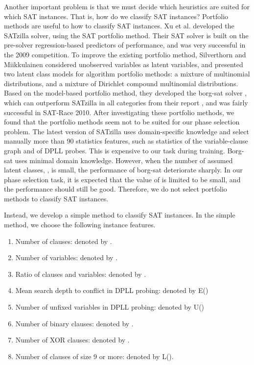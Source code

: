\documentclass{llncs}
\begin{document}
Another important problem is that we must decide which heuristics
are suited for which SAT instances. That is, how do we classify SAT
instances? Portfolio methods are useful to how to classify SAT
instances. Xu et al. \cite {XuA:9,XuB:10} developed the SATzilla
solver, using the SAT portfolio method. Their SAT solver is built on
the pre-solver regression-based predictors of performance, and was
very successful in the 2009 competition. To improve the existing
portfolio method, Silverthorn and Miikkulainen \cite {Portfolio:8}
considered unobserved variables as latent variables, and presented
two latent class models for algorithm portfolio methods: a mixture
of multinomial distributions, and a mixture of Dirichlet compound
multinomial distributions. Based on the model-based portfolio
method, they developed the borg-sat solver \cite {borgsat:7}, which
can outperform SATzilla in all categories from their report \cite
{Portfolio:8}, and was fairly successful in SAT-Race 2010. After
investigating these portfolio methods, we found that the portfolio
methods seem not to be suited for our phase selection problem. The
latest version of SATzilla \cite {XuSovler:11} uses domain-specific
knowledge and select manually more than 90 statistics features, such
as statistics of the variable-clause graph and of DPLL probes. This
is expensive to our task during training. Borg-sat uses minimal
domain knowledge. However, when the number of assumed latent
classes, , is small, the performance of borg-sat deteriorate
sharply. In our phase selection task, it is expected that the value
of  is limited to be small, and the performance should still be
good. Therefore, we do not select portfolio methods to classify SAT
instances.

Instead, we develop a simple method to classify SAT instances. In
the simple method, we choose the following instance features.

\begin{enumerate}

\item Number of clauses: denoted by .
\item Number of variables: denoted by .
\item Ratio of clauses and variables: denoted by .
\item Mean search depth to conflict in DPLL probing: denoted by E()
\item Number of unfixed variables in DPLL probing: denoted by U()
\item Number of binary clauses: denoted by .
\item Number of XOR clauses: denoted by .
\item Number of clauses of size 9 or more: denoted by L().
\end{enumerate}
\end{document}
